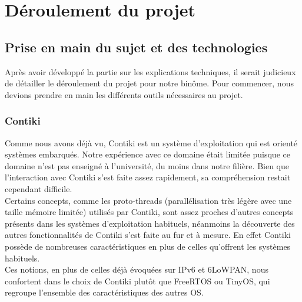 \chapter{Déroulement du projet}
\label{sec:deroulement}

\section{Prise en main du sujet et des technologies}
	Après avoir développé la partie sur les explications techniques, il serait judicieux de détailler le déroulement du projet pour notre binôme. Pour commencer, nous devions prendre en main les différents outils nécessaires au projet.
	
	\subsection{Contiki}
	Comme nous avons déjà vu, Contiki est un système d'exploitation qui est orienté systèmes embarqués. Notre expérience avec ce domaine était limitée puisque ce domaine n'est pas enseigné à l'université, du moins dans notre filière. Bien que l'interaction avec Contiki s'est faite assez rapidement, sa compréhension restait cependant difficile.\\
	Certains concepts, comme les proto-threads (parallélisation très légère avec une taille mémoire limitée) utilisés par Contiki, sont assez proches d'autres concepts présents dans les systèmes d'exploitation habituels, néanmoins la découverte des autres fonctionnalités de Contiki s'est faite au fur et à mesure. En effet Contiki possède de nombreuses caractéristiques en plus de celles qu'offrent les systèmes habituels.\\
	Ces notions, en plus de celles déjà évoquées sur IPv6 et 6LoWPAN, nous confortent dans le choix de Contiki plutôt que FreeRTOS ou TinyOS, qui regroupe l'ensemble des caractéristiques des autres OS.

